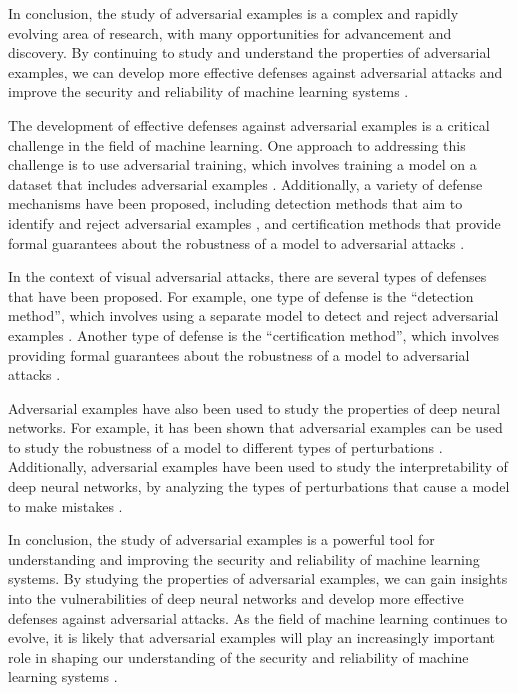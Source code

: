 \documentclass[11pt]{article}
\begin{document}
In conclusion, the study of adversarial examples is a complex and rapidly evolving area of research, with many opportunities for advancement and discovery. By continuing to study and understand the properties of adversarial examples, we can develop more effective defenses against adversarial attacks and improve the security and reliability of machine learning systems \cite{ref29}.

The development of effective defenses against adversarial examples is a critical challenge in the field of machine learning. One approach to addressing this challenge is to use adversarial training, which involves training a model on a dataset that includes adversarial examples \cite{ref27}. Additionally, a variety of defense mechanisms have been proposed, including detection methods that aim to identify and reject adversarial examples \cite{ref25}, and certification methods that provide formal guarantees about the robustness of a model to adversarial attacks \cite{ref26}.

In the context of visual adversarial attacks, there are several types of defenses that have been proposed. For example, one type of defense is the ``detection method'', which involves using a separate model to detect and reject adversarial examples \cite{ref25}. Another type of defense is the ``certification method'', which involves providing formal guarantees about the robustness of a model to adversarial attacks \cite{ref26}.

Adversarial examples have also been used to study the properties of deep neural networks. For example, it has been shown that adversarial examples can be used to study the robustness of a model to different types of perturbations \cite{ref23}. Additionally, adversarial examples have been used to study the interpretability of deep neural networks, by analyzing the types of perturbations that cause a model to make mistakes \cite{ref28}.

In conclusion, the study of adversarial examples is a powerful tool for understanding and improving the security and reliability of machine learning systems. By studying the properties of adversarial examples, we can gain insights into the vulnerabilities of deep neural networks and develop more effective defenses against adversarial attacks. As the field of machine learning continues to evolve, it is likely that adversarial examples will play an increasingly important role in shaping our understanding of the security and reliability of machine learning systems \cite{ref29}.
\end{document}
